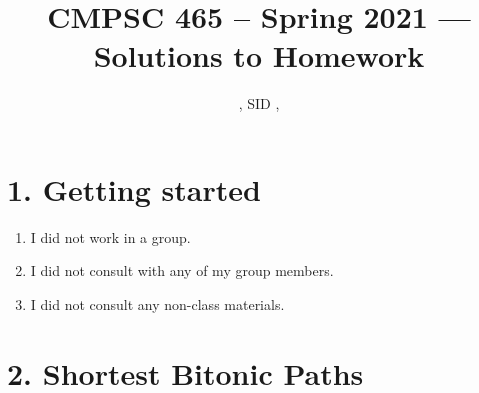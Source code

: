 \documentclass[11pt]{article}
\title{CMPSC 465 -- Spring 2021 --- Solutions to Homework \Homework}
\author{\Name, SID \SID, \texttt{\Login}}
\newenvironment{qparts}{\begin{enumerate}[{(}a{)}]}{\end{enumerate}}
\begin{document}
\maketitle


\section*{1. Getting started}
\begin{qparts}
\item
I did not work in a group.
\item
I did not consult with any of my group members.
\item
I did not consult any non-class materials.
\end{qparts}



\newpage
\section*{2. Shortest Bitonic Paths}
\end{document}
